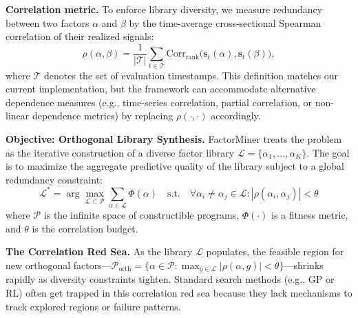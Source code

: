 \documentclass[sigconf]{acmart}
\begin{document}
\noindent\textbf{Correlation metric.}
To enforce library diversity, we measure redundancy between two factors $\alpha$ and $\beta$ by the time-average cross-sectional Spearman correlation of their realized signals:
\begin{equation}
\label{eq:rho}
  \rho(\alpha,\beta) = \frac{1}{|\mathcal{T}|}\sum_{t \in \mathcal{T}} \text{Corr}_{\text{rank}}\bigl(\mathbf{s}_t(\alpha), \mathbf{s}_t(\beta)\bigr),
\end{equation}
where $\mathcal{T}$ denotes the set of evaluation timestamps. This definition matches our current implementation, but the framework can accommodate alternative dependence measures (e.g., time-series correlation, partial correlation, or non-linear dependence metrics) by replacing $\rho(\cdot,\cdot)$ accordingly.

\textbf{Objective: Orthogonal Library Synthesis.}
FactorMiner treats the problem as the iterative construction of a diverse factor library $\mathcal{L} = \{\alpha_1, \ldots, \alpha_K\}$. 
The goal is to maximize the aggregate predictive quality of the library subject to a global redundancy constraint:
\begin{equation}
\label{eq:objective}
  \mathcal{L}^* = \arg\max_{\mathcal{L} \subset \mathcal{P}} \sum_{\alpha \in \mathcal{L}} \Phi(\alpha) \quad \text{s.t.} \quad \forall \alpha_i \neq \alpha_j \in \mathcal{L}: |\rho(\alpha_i, \alpha_j)| < \theta
\end{equation}
where $\mathcal{P}$ is the infinite space of constructible programs, $\Phi(\cdot)$ is a fitness metric, and $\theta$ is the correlation budget.

\textbf{The Correlation Red Sea.}
As the library $\mathcal{L}$ populates, the feasible region for new orthogonal factors---$\mathcal{P}_{\text{orth}} = \{\alpha \in \mathcal{P} : \max_{g \in \mathcal{L}} |\rho(\alpha, g)| < \theta\}$---shrinks rapidly as diversity constraints tighten. 
Standard search methods (e.g., GP or RL) often get trapped in this correlation red sea because they lack mechanisms to track explored regions or failure patterns.
\end{document}
